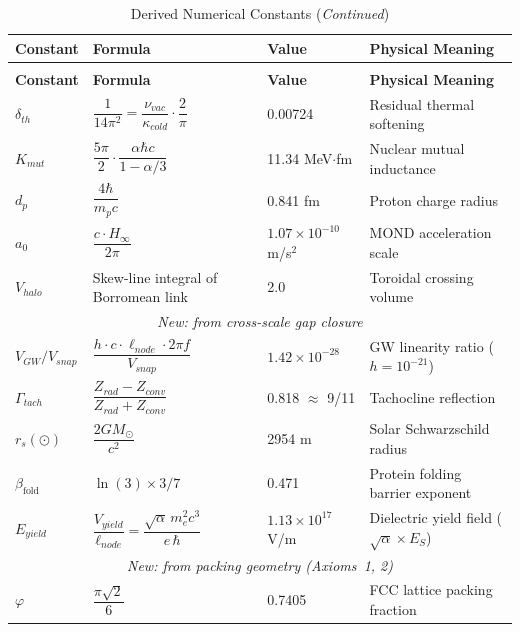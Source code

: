 {
\renewcommand{\arraystretch}{1.35}
\small
\begin{longtable}{@{} l p{4.5cm} l p{4.5cm} @{}}
\caption{Derived Numerical Constants} \\
\toprule
\textbf{Constant} & \textbf{Formula} & \textbf{Value} & \textbf{Physical Meaning} \\
\midrule
\endfirsthead
\caption[]{Derived Numerical Constants (\textit{Continued})} \\
\toprule
\textbf{Constant} & \textbf{Formula} & \textbf{Value} & \textbf{Physical Meaning} \\
\midrule
\endhead
\bottomrule
\endfoot
$\delta_{th}$ & $\dfrac{1}{14\pi^2}
    = \dfrac{\nu_{vac}}{\kappa_{cold}} \cdot \dfrac{2}{\pi}$
    & 0.00724
    & Residual thermal softening \\[6pt]
$K_{mut}$ & $\dfrac{5\pi}{2}\cdot\dfrac{\alpha\hbar c}{1-\alpha/3}$
    & 11.34 MeV$\cdot$fm
    & Nuclear mutual inductance \\[6pt]
$d_p$ & $\dfrac{4\hbar}{m_p c}$
    & 0.841 fm
    & Proton charge radius \\[6pt]
$a_0$ & $\dfrac{c \cdot H_\infty}{2\pi}$
    & $1.07\times10^{-10}$ m/s$^2$
    & MOND acceleration scale \\[6pt]
$V_{halo}$ & Skew-line integral of Borromean link
    & 2.0
    & Toroidal crossing volume \\[6pt]
\midrule
\multicolumn{4}{c}{\textit{New: from cross-scale gap closure}} \\[4pt]
$V_{GW}/V_{snap}$ & $\dfrac{h \cdot c \cdot \ell_{node} \cdot 2\pi f}{V_{snap}}$
    & $1.42\times10^{-28}$
    & GW linearity ratio ($h=10^{-21}$) \\[6pt]
$\Gamma_{tach}$ & $\dfrac{Z_{rad} - Z_{conv}}{Z_{rad} + Z_{conv}}$
    & 0.818 $\approx$ 9/11
    & Tachocline reflection \\[6pt]
$r_s(\odot)$ & $\dfrac{2GM_\odot}{c^2}$
    & 2954 m
    & Solar Schwarzschild radius \\[6pt]
$\beta_\text{fold}$ & $\ln(3) \times 3/7$
    & 0.471
    & Protein folding barrier exponent \\[6pt]
$E_{yield}$ & $\dfrac{V_{yield}}{\ell_{node}}
    = \dfrac{\sqrt{\alpha}\, m_e^2 c^3}{e\, \hbar}$
    & $1.13\times10^{17}$ V/m
    & Dielectric yield field ($\sqrt{\alpha}\times E_S$) \\[6pt]
\midrule
\multicolumn{4}{c}{\textit{New: from packing geometry (Axioms~1, 2)}} \\[4pt]
$\varphi$ & $\dfrac{\pi\sqrt{2}}{6}$
    & 0.7405
    & FCC lattice packing fraction \\[6pt]

\end{longtable}}
